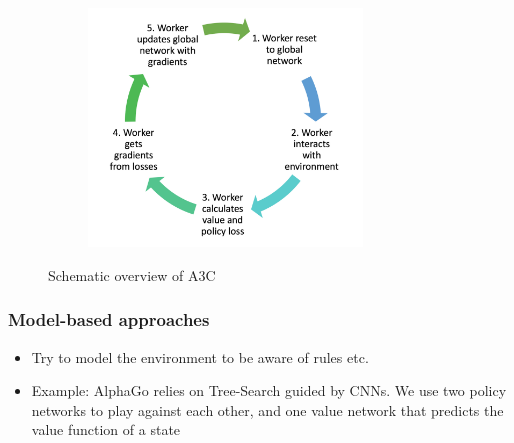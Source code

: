 \begin{itemize}
\begin{figure}[ht!]
\begin{subfigure}{0.45\textwidth}
		\end{subfigure}
		\begin{subfigure}{0.45\textwidth}
			\centering
			\includegraphics[width=0.8\textwidth]{figures/RL_A3C_cycle.png}
		\end{subfigure}
		\caption{Schematic overview of A3C}
		\label{fig:RL_A3C}
	\end{figure}
\end{itemize}
\subsubsection{Model-based approaches}
\begin{itemize}
	\item Try to model the environment to be aware of rules etc. 
	\item Example: AlphaGo relies on Tree-Search guided by CNNs. We use two policy networks to play against each other, and one value network that predicts the value function of a state
\end{itemize}